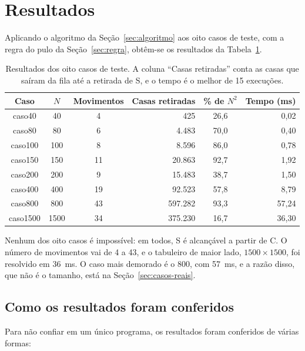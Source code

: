 \section{Resultados}
\label{sec:resultados}

Aplicando o algoritmo da Seção~\ref{sec:algoritmo} aos oito casos de teste, com a regra do
pulo da Seção~\ref{sec:regra}, obtêm-se os resultados da Tabela~\ref{tab:resultados}.

\begin{table}[ht]
  \centering
  \caption{Resultados dos oito casos de teste. A coluna ``Casas retiradas'' conta as casas que
  saíram da fila até a retirada de S, e o tempo é o melhor de 15 execuções.}
  \label{tab:resultados}
  \small
  \begin{tabular}{|c|c|c|r|c|r|}
    \hline
    \textbf{Caso} & \textbf{$N$} & \textbf{Movimentos} & \textbf{Casas retiradas}
      & \textbf{\% de $N^2$} & \textbf{Tempo (ms)}\\
    \hline
    caso40 & 40 & 4 & 425 & 26,6 & 0,02\\
    \hline
    caso80 & 80 & 6 & 4.483 & 70,0 & 0,40\\
    \hline
    caso100 & 100 & 8 & 8.596 & 86,0 & 0,78\\
    \hline
    caso150 & 150 & 11 & 20.863 & 92,7 & 1,92\\
    \hline
    caso200 & 200 & 9 & 15.483 & 38,7 & 1,50\\
    \hline
    caso400 & 400 & 19 & 92.523 & 57,8 & 8,79\\
    \hline
    caso800 & 800 & 43 & 597.282 & 93,3 & 57,24\\
    \hline
    caso1500 & 1500 & 34 & 375.230 & 16,7 & 36,30\\
    \hline
  \end{tabular}
\end{table}

Nenhum dos oito casos é impossível: em todos, S é alcançável a partir de C. O número de
movimentos vai de 4 a 43, e o tabuleiro de maior lado, $1500 \times 1500$, foi resolvido em
36~ms. O caso mais demorado é o 800, com 57~ms, e a razão disso, que não é o tamanho, está na
Seção~\ref{sec:casos-reais}.

\subsection{Como os resultados foram conferidos}
\label{sec:conferencia}

Para não confiar em um único programa, os resultados foram conferidos de várias formas:

